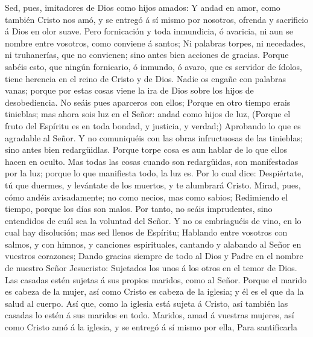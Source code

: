  Sed, pues, imitadores de Dios como hijos amados:
 Y andad en amor, como también Cristo nos amó, y se
entregó á sí mismo por nosotros, ofrenda y sacrificio á Dios en olor
suave.  Pero fornicación y toda inmundicia, ó avaricia, ni
aun se nombre entre vosotros, como conviene á santos;  Ni
palabras torpes, ni necedades, ni truhanerías, que no convienen; sino
antes bien acciones de gracias.  Porque sabéis esto, que
ningún fornicario, ó inmundo, ó avaro, que es servidor de ídolos, tiene
herencia en el reino de Cristo y de Dios.  Nadie os engañe
con palabras vanas; porque por estas cosas viene la ira de Dios sobre
los hijos de desobediencia.  No seáis pues aparceros con
ellos;  Porque en otro tiempo erais tinieblas; mas ahora
sois luz en el Señor: andad como hijos de luz,  (Porque el
fruto del Espíritu es en toda bondad, y justicia, y verdad;)
 Aprobando lo que es agradable al Señor. 
Y no comuniquéis con las obras infructuosas de las tinieblas; sino antes
bien redargüidlas.  Porque torpe cosa es aun hablar de lo
que ellos hacen en oculto.  Mas todas las cosas cuando
son redargüidas, son manifestadas por la luz; porque lo que manifiesta
todo, la luz es.  Por lo cual dice: Despiértate, tú que
duermes, y levántate de los muertos, y te alumbrará Cristo.
 Mirad, pues, cómo andéis avisadamente; no como necios,
mas como sabios;  Redimiendo el tiempo, porque los días
son malos.  Por tanto, no seáis imprudentes, sino
entendidos de cuál sea la voluntad del Señor.  Y no os
embriaguéis de vino, en lo cual hay disolución; mas sed llenos de
Espíritu;  Hablando entre vosotros con salmos, y con
himnos, y canciones espirituales, cantando y alabando al Señor en
vuestros corazones;  Dando gracias siempre de todo al
Dios y Padre en el nombre de nuestro Señor Jesucristo: 
Sujetados los unos á los otros en el temor de Dios.  Las
casadas estén sujetas á sus propios maridos, como al Señor.
 Porque el marido es cabeza de la mujer, así como Cristo
es cabeza de la iglesia; y él es el que da la salud al cuerpo.
 Así que, como la iglesia está sujeta á Cristo, así
también las casadas lo estén á sus maridos en todo. 
Maridos, amad á vuestras mujeres, así como Cristo amó á la iglesia, y se
entregó á sí mismo por ella,  Para santificarla
